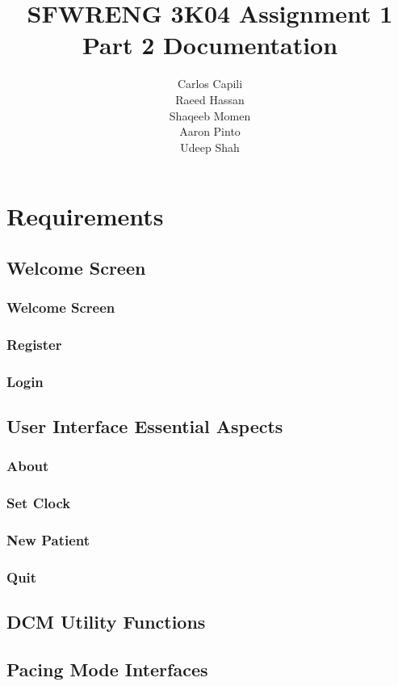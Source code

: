 \documentclass[12pt]{article}
\title{SFWRENG 3K04 Assignment 1 Part 2 Documentation}
\author{
    Carlos Capili \\
    Raeed Hassan \\
    Shaqeeb Momen \\
    Aaron Pinto \\
    Udeep Shah
}
\date{}
\begin{document}
\maketitle \newpage
\tableofcontents \newpage

\section{Requirements}
\subsection{Welcome Screen}
\subsubsection{Welcome Screen}
\subsubsection{Register}
\subsubsection{Login}

\subsection{User Interface Essential Aspects}
\subsubsection{About}
\subsubsection{Set Clock}
\subsubsection{New Patient}
\subsubsection{Quit}

\subsection{DCM Utility Functions}

\subsection{Pacing Mode Interfaces}
\end{document}
